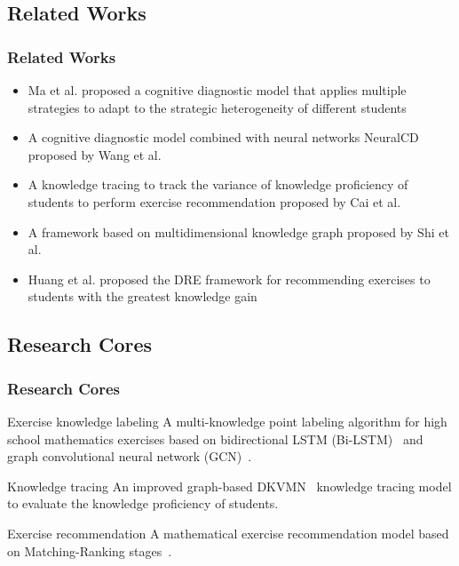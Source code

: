 \documentclass[10pt,aspectratio=43,mathserif]{beamer}
\begin{document}
\subsection{Related Works}
\begin{frame}
	\frametitle{Related Works}
	\begin{itemize}
		\item Ma et al. proposed a cognitive diagnostic model that applies multiple strategies to adapt to the strategic heterogeneity of different students~\cite{Ma2019MCDM}
		\item A cognitive diagnostic model combined with neural networks NeuralCD proposed by Wang et al.~\cite{wang2020neural}
		\item A knowledge tracing to track the variance of knowledge proficiency of students to perform exercise recommendation proposed by Cai et al.~\cite{9064104}
		\item A framework based on multidimensional knowledge graph proposed by Shi et al.~\cite{SHI2020105618}
		\item Huang et al. proposed the DRE framework for recommending exercises to students with the greatest knowledge gain~\cite{DRE2019Huang}
	\end{itemize}


\end{frame}


\subsection{Research Cores}
\begin{frame}
	\frametitle{Research Cores}
	\begin{block}{Exercise knowledge labeling}
		A multi-knowledge point labeling algorithm for high school mathematics exercises based on bidirectional LSTM (Bi-LSTM)~\cite{chen2017improving} and graph convolutional neural network (GCN)~\cite{kipf2016semi}.
	\end{block}
	\begin{block}{Knowledge tracing}
		An improved graph-based DKVMN~\cite{zhang2017dynamic} knowledge tracing model to evaluate the knowledge proficiency of students.
	\end{block}
	\begin{block}{Exercise recommendation}
		A mathematical exercise recommendation model based on Matching-Ranking stages~\cite{segev2009context}.
	\end{block}
\end{frame}
\end{document}
